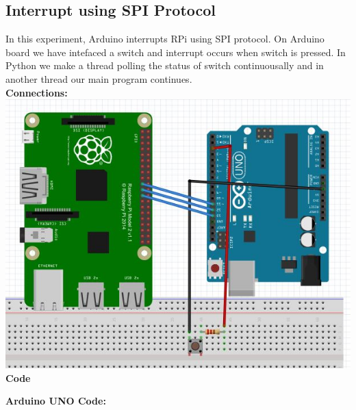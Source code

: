 \documentclass[11pt,a4paper]{article}
\begin{document}
	\subsection{Interrupt using SPI Protocol}
	In this experiment, Arduino interrupts RPi using SPI protocol. On Arduino board we have intefaced a switch and interrupt occurs when switch is pressed. In Python we make a thread polling the status of switch continuousally and in another thread our main program continues.\\
	\vspace{5mm}
	\textbf{Connections:}\\
	\vspace{5mm}
	\centering
	\includegraphics[scale= 0.4]{rpi_with_arduino_spi.jpg}
	\vspace{5mm}
	\flushleft
	\textbf{Code}
	\vspace{5mm}
	
	\newpage
	\textbf{Arduino UNO Code:}
	\vspace{5mm}
	
\end{document}
